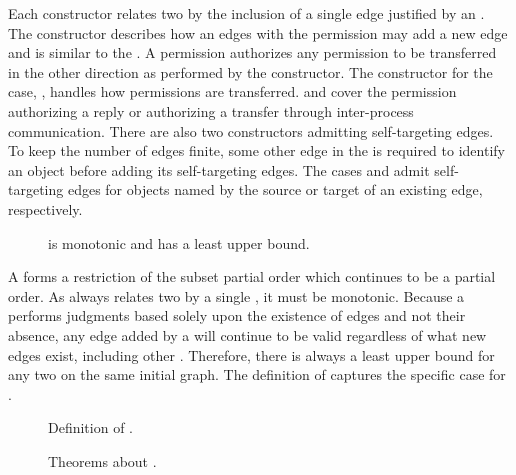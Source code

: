 Each \COQtransfer{} constructor relates two \TMaccessGraphs{} by the inclusion of a single edge justified by an \TMaccessRight{}.
The \COQtransferRead{} constructor describes how an edges with the \NMrd{} permission may add a new edge and is similar to the \NMfetch{} \TMop{}.
A \NMwr{} permission authorizes any permission to be transferred in the other direction as performed by the \COQtransferWrite{} constructor.
The constructor for the \NMwk{} case, \COQtransferWeak{}, handles how \NMwk{} permissions are transferred.
\COQtransferReply{} and \COQtransferSend{} cover the \NMtx{} permission authorizing a reply or authorizing a transfer through inter-process communication.
There are also two constructors admitting self-targeting edges.
To keep the number of edges finite, some other edge in the \TMaccessGraph{} is required to identify an object before adding its self-targeting edges.
The cases \COQtransferSelfSrc{} and \COQtransferSelfTgt{} admit self-targeting edges for objects named by the source or target of an existing edge, respectively.

\begin{figure}
  \COQDOCtransferMonotonic{}
  \COQDOCtransferLUB{}
  \caption{\COQtransfer is monotonic and has a least upper bound. \label{fig:access:transferMonotonic}\label{fig:access:transferLUB}}
\end{figure}

A \TMtransfer{} forms a restriction of the subset partial order which continues to be a partial order.
As \TMtransfer{} always relates two \TMaccessGraphs{} by a single \TMaccessEdge{}, it must be monotonic.
Because a \TMtransfer{} performs judgments based solely upon the existence of edges and not their absence, any edge added by a \TMtransfer{} will continue to be valid regardless of what new edges exist, including other \TMtransfers{}.
Therefore, there is always a least upper bound for any two \TMtransfers{} on the same initial graph.
The definition of \COQtransferLUB{} captures the specific case for \TMtransfer{}.

\begin{figure}
  \COQDOCpotTransfer{}
  \caption{Definition of \COQpotTransfer{}. \label{fig:access:potTransfer}}
\end{figure}

\begin{figure}
  \COQDOCpotTransferLUB{}
  \caption{Theorems about \COQpotTransfer{}. \label{fig:access:potTransferLUB}}
\end{figure}

